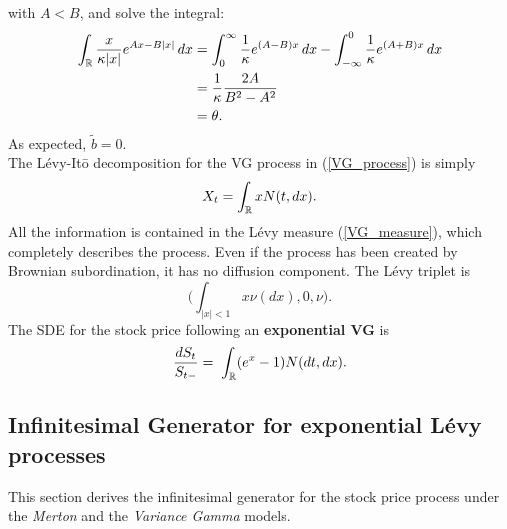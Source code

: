 with $A<B$, and solve the integral:
\begin{align*}
 \int_{\mathbb{R}} \frac{x}{\kappa |x|} e^{Ax-B|x|} \, dx &= \int_{0}^{\infty} \frac{1}{\kappa} e^{(A-B)x} \, dx
 - \int_{-\infty}^0 \frac{1}{\kappa} e^{(A+B)x} \, dx \\
 &= \frac{1}{\kappa} \frac{2A}{B^2-A^2} \\
 &= \theta.
\end{align*}
As expected, $\tilde b = 0$. \\
The Lévy-It\={o} decomposition for the VG process in (\ref{VG_process}) is simply
\begin{equation}
X_t = \int_{\mathbb{R}} x N(t,dx). 
\end{equation}
All the information is contained in the Lévy measure (\ref{VG_measure}),
which completely describes the process. Even if the process has been created by Brownian
subordination, it has no diffusion component.  
The L\'evy triplet is
\begin{equation}\label{VG_triplet}
 \biggl( \int_{|x|<1} x \nu(dx), 0, \nu \biggr).
\end{equation}
The SDE for the stock price following an \textbf{exponential VG} is 
\begin{equation}\label{VG_sde}
 \frac{d S_t}{S_{t-}}  = \; \int_{\mathbb{R}} (e^{x} - 1) N(dt,dx).  
\end{equation}


\subsection{Infinitesimal Generator for exponential Lévy processes} 

This section derives the infinitesimal generator for the stock price process under the \emph{Merton} and the \emph{Variance Gamma} models.\\

